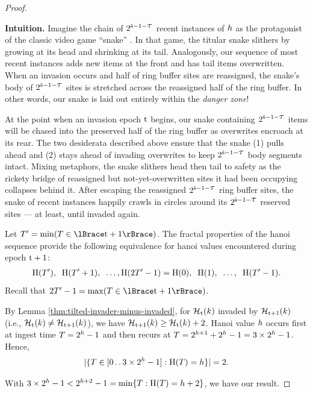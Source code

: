 \begin{proof}
\begin{mybox}
\textbf{Intuition.}
Imagine the chain of $2^{\colors - 1 - \colortau}$ recent instances of \hv{} $\colorh$ as the protagonist of the classic video game ``snake'' \citep{de2016complexity}.
In that game, the titular snake slithers by growing at its head and shrinking at its tail.
Analogously, our sequence of most recent \hv{} instances adds new items at the front and has tail items overwritten.
When an invasion occurs and half of ring buffer sites are reassigned, the snake's body of $2^{\colors - 1 - \colortau}$ sites is stretched across the reassigned half of the ring buffer.
In other words, our snake is laid out entirely within the \textit{danger zone}!

At the point when an invasion epoch $\colort$ begins, our snake containing $2^{\colors - 1 - \colortau}$ items will be chased into the preserved half of the ring buffer as overwrites encroach at its rear.
The two desiderata described above ensure that the snake (1) pulls ahead and (2) stays ahead of invading overwrites to keep $2^{\colors - 1 - \colortau}$ body segments intact.
Mixing metaphors, the snake slithers head then tail to safety as the rickety bridge of reassigned but not-yet-overwritten sites it had been occupying collapses behind it.
After escaping the reassigned $2^{\colors - 1 - \colortau}$ ring buffer sites, the snake of recent \hv{} instances happily crawls in circles around its $2^{\colors - 1 - \colortau}$ reserved sites --- at least, until invaded again.
\end{mybox}

\begin{proofpart}
Let $\colorT' = \min(\colorT \in \colortsetofTone)$.
The fractal properties of the hanoi sequence provide the following equivalence for hanoi values encountered during epoch $\colort + 1$:
\begin{align*}
\colorH(\colorT'),\;\; \colorH(\colorT'+1), \;\;\ldots, \colorH(2\colorT' - 1) = \colorH(0),\;\; \colorH(1), \;\;\ldots,\;\; \colorH(\colorT' - 1).
\end{align*}
Recall that $2\colorT' - 1 = \max(\colorT \in \colortsetofTone)$.

By Lemma \ref{thm:tilted-invader-minus-invaded}, for \hv{} $\colorHcal_{\colort}(\colork)$ invaded by \hv{} $\colorHcal_{\colort + 1}(\colork)$ (i.e., $\colorHcal_{\colort}(\colork) \neq \colorHcal_{\colort + 1}(\colork)$), we have $\colorHcal_{\colort + 1}(\colork) \geq \colorHcal_{\colort}(\colork) + 2$.
Hanoi value $\colorh$ occurs first at ingest time $\colorT = 2^{\colorh} - 1$ and then recurs at $\colorT = 2^{\colorh + 1} + 2^{\colorh} - 1 = 3 \times 2^{\colorh} - 1$.
Hence,
\begin{align*}
|\{\colorT \in [0 \twodots 3 \times 2^{\colorh} - 1] : \colorH(\colorT) = \colorh\}| = 2.
\end{align*}
\end{proofpart}
With $3 \times 2^{\colorh} - 1 < 2^{\colorh + 2} - 1 = \min\{\colorT : \colorH(\colorT) = \colorh + 2\}$, we have our result.


\end{proof}
